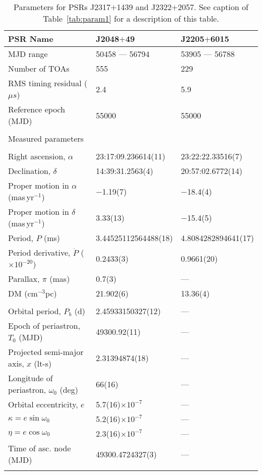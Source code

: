 \begin{table*}
\caption{Parameters for PSRs J2317$+$1439 and J2322$+$2057. See
caption of Table~\ref{tab:param1} for a description of this table.}
\begin{minipage}{180mm}
\label{tab:param11}
\begin{tabular}{lll}
\hline\hline
PSR Name & J2048$+$49 & J2205$+$6015 \\ 
\hline
MJD range & 50458 --- 56794 & 53905 --- 56788 \\ 
 Number of TOAs & 555 & 229 \\ 
 RMS timing residual ($\mu s$) & 2.4 & 5.9 \\ 
 Reference epoch (MJD) & 55000 & 55000 \\ 
\\ 
Measured parameters\\ 
\\ 
Right ascension, $\alpha$ & 23:17:09.236614(11) & 23:22:22.33516(7) \\ 
Declination, $\delta$ & 14:39:31.2563(4) & 20:57:02.6772(14) \\ 
Proper motion in $\alpha$ (mas\,yr$^{-1}$) & $-$1.19(7) & $-$18.4(4) \\ 
Proper motion in $\delta$ (mas\,yr$^{-1}$) & 3.33(13) & $-$15.4(5) \\ 
Period,  $P$ (ms) & 3.44525112564488(18) & 4.8084282894641(17) \\ 
Period derivative, $\dot{P}$ ($\times 10^{-20}$) & 0.2433(3) & 0.9661(20) \\ 
Parallax, $\pi$ (mas) & 0.7(3) & --- \\ 
DM (cm$^{-3}$pc) & 21.902(6) & 13.36(4) \\ 
\\ 
Orbital period, $P_b$ (d) & 2.45933150327(12) & --- \\ 
Epoch of periastron, $T_0$ (MJD) & 49300.92(11) & --- \\ 
Projected semi-major axis, $x$ (lt-s) & 2.31394874(18) & --- \\ 
Longitude of periastron, $\omega_0$ (deg) & 66(16) & --- \\ 
Orbital eccentricity, $e$ & 5.7(16)$\times 10^{-7}$ & --- \\ 
$\kappa = e \sin \omega_0$ & 5.2(16)$\times 10^{-7}$ & --- \\ 
$\eta = e \cos \omega_0$ & 2.3(16)$\times 10^{-7}$ & --- \\ 
Time of asc. node (MJD) & 49300.4724327(3) & --- \\ 
\\ 

\end{tabular}
\end{minipage}
\end{table*}
